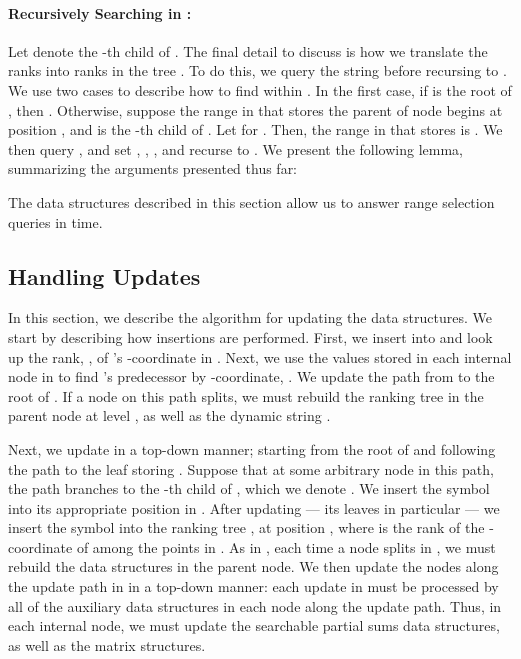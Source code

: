 \documentclass{llncs}
\begin{document}
\paragraph{Recursively Searching in :} 
Let  denote the -th child of .  The final detail to
discuss is how we translate the ranks  into ranks in the
tree .  To do this, we query the string  before
recursing to .  We use two cases to describe how to find
 within . In the first case, if  is the root of ,
then .  Otherwise, suppose the range in 
that stores the parent  of node  begins at position , and
 is the -th child of .  Let  for . Then, the range in  that
stores  is . We then query , and
set , , , and recurse to .  We present the following
lemma, summarizing the arguments presented thus far:

\begin{lemma}
\label{lem:query}
The data structures described in this section allow us to answer range
selection queries in  time.
\end{lemma}

\subsection{Handling Updates}

In this section, we describe the algorithm for updating the data
structures.  We start by describing how insertions are performed.
First, we insert  into  and look up the rank, , of 's
-coordinate in .  Next, we use the values stored in each
internal node in  to find 's predecessor by -coordinate,
.  We update the path from  to the root of .  If a node 
on this path splits, we must rebuild the ranking tree in the parent
node  at level , as well as the dynamic string .

Next, we update  in a top-down manner; starting from the root of
 and following the path to the leaf storing .  Suppose that at
some arbitrary node  in this path, the path branches to the -th
child of , which we denote .  We insert the symbol  into
its appropriate position in . After updating  --- its
leaves in particular --- we insert the symbol  into the ranking
tree , at position , where  is the rank of the
-coordinate of  among the points in .  As in , each
time a node splits in , we must rebuild the data structures in
the parent node.  We then update the nodes along the update path in
 in a top-down manner: each update in  must be processed
by all of the auxiliary data structures in each node along the update
path.  Thus, in each internal node, we must update the searchable
partial sums data structures, as well as the matrix structures.
\end{document}
